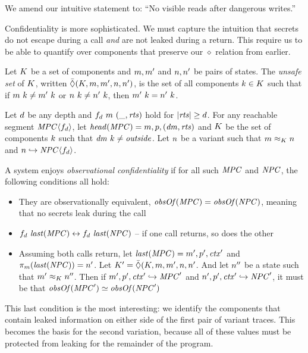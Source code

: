 \documentclass[acmsmall,review,anonymous]{acmart}\settopmatter{printfolios=true,printccs=false,printacmref=false}
\begin{document}
We amend our intuitive statement to: ``No visible reads after dangerous writes.''

Confidentiality is more sophisticated. We must capture the intuition that
secrets do not escape during a call {\em and} are not leaked during a return.
This require us to be able to quantify over components that preserve our \(\diamond\)
relation from earlier.

 Let \(K\) be a set of components and \(m,m'\) and \(n,n'\)
be pairs of states. The {\em unsafe set} of \(K\), written
\(\bar{\Diamond}(K,m,m',n,n')\), is the set of all components
\(k \in K\) such that if
\(m ~ k \not = m' ~ k\) or
\(n ~ k \not = n' ~ k\), then
\(m' ~ k = n' ~ k\).

 Let \(d\) be any depth and \(f_d ~ m ~ (\_, \mathit{rts})\) hold for
\(|\mathit{rts}| \geq d\). For any reachable segment \(\mathit{MPC} \langle f_d \rangle\),
let \(\mathit{head}(\mathit{MPC}) = m,p,(\mathit{dm},\mathit{rts})\) and
\(K\) be the set of components \(k\) such that \(\mathit{dm} ~ k \not = \mathit{outside}\).
Let \(n\) be a variant such that \(m \approx_K n\) and
\(n \hookrightarrow \mathit{NPC}\langle f_d \rangle\).

A system enjoys {\em observational confidentiality} if for all such
\(\mathit{MPC}\) and \(\mathit{NPC}\), the following conditions all hold:

\begin{itemize}
\item They are observationally equivalent, \(\mathit{obsOf}(\mathit{MPC}) = \mathit{obsOf}(\mathit{NPC})\),
  meaning that no secrets leak during the call
\item \(f_d ~ \mathit{last}(\mathit{MPC}) \leftrightarrow f_d ~ \mathit{last}(\mathit{NPC})\) --
  if one call returns, so does the other
\item Assuming both calls return, let \(\mathit{last}(\mathit{MPC}) = m',p',\mathit{ctx}'\)
  and \(\pi_m(\mathit{last}(\mathit{NPC})) = n'\).
  Let \(K' = \bar{\Diamond}(K,m,m',n,n'\).
  And let \(n''\) be a state such that \(m' \approx_K n''\).
  Then if \(m',p',\mathit{ctx}' \hookrightarrow \mathit{MPC}'\) and
  \(n',p',\mathit{ctx}' \hookrightarrow \mathit{NPC}'\), it must be
  that \(\mathit{obsOf}(\mathit{MPC}') \simeq \mathit{obsOf}(\mathit{NPC}')\)
\end{itemize}

This last condition is the most interesting: we identify the components that
contain leaked information on either side of the first pair of variant traces.
This becomes the basis for the second variation, because all of these values
must be protected from leaking for the remainder of the program.
\end{document}
